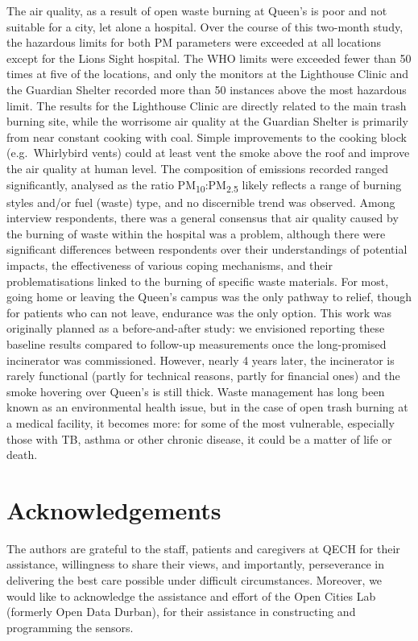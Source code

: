 \documentclass[
  authoryear,
  review,
  3p]{elsarticle}
\begin{document}
The air quality, as a result of open waste burning at Queen's is poor
and not suitable for a city, let alone a hospital. Over the course of
this two-month study, the hazardous limits for both PM parameters were
exceeded at all locations except for the Lions Sight hospital. The WHO
limits were exceeded fewer than 50 times at five of the locations, and
only the monitors at the Lighthouse Clinic and the Guardian Shelter
recorded more than 50 instances above the most hazardous limit. The
results for the Lighthouse Clinic are directly related to the main trash
burning site, while the worrisome air quality at the Guardian Shelter is
primarily from near constant cooking with coal. Simple improvements to
the cooking block (e.g.~Whirlybird vents) could at least vent the smoke
above the roof and improve the air quality at human level. The
composition of emissions recorded ranged significantly, analysed as the
ratio PM\textsubscript{10}:PM\textsubscript{2.5} likely reflects a range
of burning styles and/or fuel (waste) type, and no discernible trend was
observed. Among interview respondents, there was a general consensus
that air quality caused by the burning of waste within the hospital was
a problem, although there were significant differences between
respondents over their understandings of potential impacts, the
effectiveness of various coping mechanisms, and their problematisations
linked to the burning of specific waste materials. For most, going home
or leaving the Queen's campus was the only pathway to relief, though for
patients who can not leave, endurance was the only option. This work was
originally planned as a before-and-after study: we envisioned reporting
these baseline results compared to follow-up measurements once the
long-promised incinerator was commissioned. However, nearly 4 years
later, the incinerator is rarely functional (partly for technical
reasons, partly for financial ones) and the smoke hovering over Queen's
is still thick. Waste management has long been known as an environmental
health issue, but in the case of open trash burning at a medical
facility, it becomes more: for some of the most vulnerable, especially
those with TB, asthma or other chronic disease, it could be a matter of
life or death.

\hypertarget{acknowledgements}{%
\section{Acknowledgements}\label{acknowledgements}}

The authors are grateful to the staff, patients and caregivers at QECH
for their assistance, willingness to share their views, and importantly,
perseverance in delivering the best care possible under difficult
circumstances. Moreover, we would like to acknowledge the assistance and
effort of the Open Cities Lab (formerly Open Data Durban), for their
assistance in constructing and programming the sensors.
\end{document}
